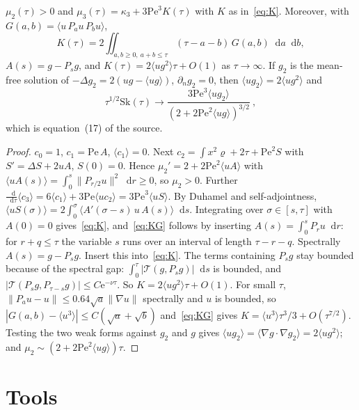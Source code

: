 \documentclass[11pt,a4paper]{report}
\DeclareRobustCommand*{\avg}[1]{\langle #1\rangle}
\DeclareRobustCommand*{\norm}[1]{\lVert #1\rVert}
\DeclareRobustCommand*{\dd}{\mathop{}\!\mathrm{d}}
\begin{document}
\begin{proposition}\label{prop:moments}
\(\mu_2(\tau)>0\) and \(\mu_3(\tau)=\kappa_3+3\mathrm{Pe}^3K(\tau)\) with \(K\) as in~\eqref{eq:K}. Moreover, with
\(G(a,b)=\avg{u\,P_au\,P_bu}\),
\begin{equation}\label{eq:KG}
K(\tau)=2\iint_{a,b\ge0,\ a+b\le\tau}(\tau-a-b)\,G(a,b)\dd a\dd b ,
\end{equation}
\(A(s)=g-P_sg\), and \(K(\tau)=2\avg{ug^2}\tau+O(1)\) as \(\tau\to\infty\). If \(g_2\) is the mean-free solution of
\(-\Delta g_2=2(ug-\avg{ug})\), \(\partial_ng_2=0\), then \(\avg{ug_2}=2\avg{ug^2}\) and
\begin{equation}\label{eq:Sinf}
\tau^{1/2}\mathrm{Sk}(\tau)\to\frac{3\mathrm{Pe}^3\avg{ug_2}}{(2+2\mathrm{Pe}^2\avg{ug})^{3/2}}\ ,
\end{equation}
which is equation~(17) of the source.
\end{proposition}
\begin{proof}
\(c_0=1\), \(c_1=\mathrm{Pe}\,A\), \(\avg{c_1}=0\). Next \(c_2=\int x^2\varrho+2\tau+\mathrm{Pe}^2S\) with
\(S'=\Delta S+2uA\), \(S(0)=0\). Hence \(\mu_2'=2+2\mathrm{Pe}^2\avg{uA}\) with
\(\avg{uA(s)}=\int_0^s\norm{P_{r/2}u}^2\dd r\ge0\), so \(\mu_2>0\). Further \(\frac{\dd}{\dd\tau}\avg{c_3}=6\avg{c_1}+3\mathrm{Pe}\avg{uc_2}
=3\mathrm{Pe}^3\avg{uS}\). By Duhamel and self-adjointness, \(\avg{uS(\sigma)}=2\int_0^\sigma\avg{A'(\sigma-s)\,u\,A(s)}\dd s\).
Integrating over \(\sigma\in[s,\tau]\) with \(A(0)=0\) gives~\eqref{eq:K}, and~\eqref{eq:KG} follows by inserting
\(A(s)=\int_0^sP_ru\dd r\): for \(r+q\le\tau\) the variable \(s\) runs over an interval of length \(\tau-r-q\).
Spectrally \(A(s)=g-P_sg\). Insert this into~\eqref{eq:K}. The terms containing \(P_sg\) stay bounded because of the
spectral gap: \(\int_0^\tau|\mathcal T(g,P_sg)|\dd s\) is bounded, and \(|\mathcal T(P_sg,P_{\tau-s}g)|\le C\mathrm e^{-\nu\tau}\).
So \(K=2\avg{ug^2}\tau+O(1)\). For small \(\tau\), \(\norm{P_au-u}\le0.64\sqrt a\norm{\nabla u}\) spectrally and \(u\) is bounded, so \(|G(a,b)-\avg{u^3}|\le C(\sqrt a+\sqrt b)\) and~\eqref{eq:KG} gives \(K=\avg{u^3}\tau^3/3+O(\tau^{7/2})\). Testing the two weak forms against \(g_2\) and \(g\) gives
\(\avg{ug_2}=\avg{\nabla g\cdot\nabla g_2}=2\avg{ug^2}\); and \(\mu_2\sim(2+2\mathrm{Pe}^2\avg{ug})\tau\).
\end{proof}

\section{Tools}\label{sec:tools}
\end{document}
